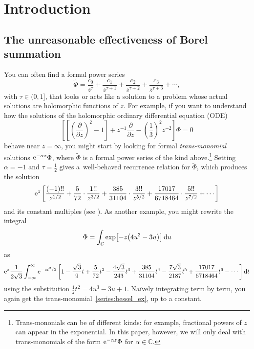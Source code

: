 \documentclass[pdftex]{sigma}
\newcommand{\C}{\mathbb{C}}
\newcommand{\series}[1]{\tilde{#1}}
\numberwithin{equation}{section}
\begin{document}
\section{Introduction}

\subsection{The unreasonable effectiveness of Borel summation}\label{intro:summation}
You can often find a formal power series
\[ \series{\Phi} = \frac{c_0}{z^\tau} + \frac{c_1}{z^{\tau+1}} + \frac{c_2}{z^{\tau+2}} + \frac{c_3}{z^{\tau+3}} + \cdots , \]
with $\tau \in (0, 1]$, that looks or acts like a solution to a problem whose actual solutions are holomorphic functions of $z$. For example, if you want to understand how the solutions of the holomorphic ordinary differential equation (ODE)
\begin{equation}
\left[ \left[ \left(\frac{\partial}{\partial z}\right)^2 - 1 \right] + z^{-1} \frac{\partial}{\partial z} - \left(\frac{1}{3}\right)^2 z^{-2} \right] \Phi= 0 \label{eqn:bessel_rescaled_ex}
\end{equation}
behave near $z = \infty$, you might start by looking for formal {\em trans-monomial} solutions ${\rm e}^{-\alpha z} \series{\Phi}$, where $\series{\Phi}$ is a formal power series of the kind above.\footnote{Trans-mononials can be of different kinds: for example, fractional powers of $z$ can appear in the exponential. In this paper, however, we will only deal with trans-monomials of the form ${\rm e}^{-\alpha z} \series{\Phi}$ for $\alpha \in \C$.} Setting $\alpha = -1$ and $\tau = \frac{1}{2}$ gives a~well-behaved recurrence relation for $\series{\Phi}$, which produces the solution
\begin{equation}
{\rm e}^{z} \left[ \frac{(-1)!!}{z^{1/2}} + \frac{5}{72} \cdot \frac{1!!}{z^{3/2}} + \frac{385}{31104} \cdot \frac{3!!}{z^{5/2}} + \frac{17017}{6718464} \cdot \frac{5!!}{z^{7/2}} + \cdots \right] \label{series:bessel_ex}
\end{equation}
and its constant multiples (see \cite[equation~(10.40.1)]{dlmf}). As another example, you might rewrite the integral
\begin{equation}\label{int:bessel_ex}
\Phi = \int_{\mathcal{C}} \exp\bigl[-z \bigl(4 u^3 - 3 u\bigr)\bigr]\,{\rm d}u
\end{equation}
as
\[ {\rm e}^{z} \frac{1}{2\sqrt{3}} \int_{-\infty}^\infty {\rm e}^{-z t^2/2} \left[ 1 - \frac{\sqrt{3}}{9} t + \frac{5}{72} t^2 - \frac{4\sqrt{3}}{243} t^3 + \frac{385}{31104} t^4 - \frac{7\sqrt{3}}{2187} t^5 + \frac{17017}{6718464} t^6 - \cdots \right] {\rm d}t \]
using the substitution $\frac{1}{2} t^2 = 4u^3 - 3u + 1$. Na\"{i}vely integrating term by term, you again get the trans-monomial~\eqref{series:bessel_ex}, up to a constant.
\end{document}
